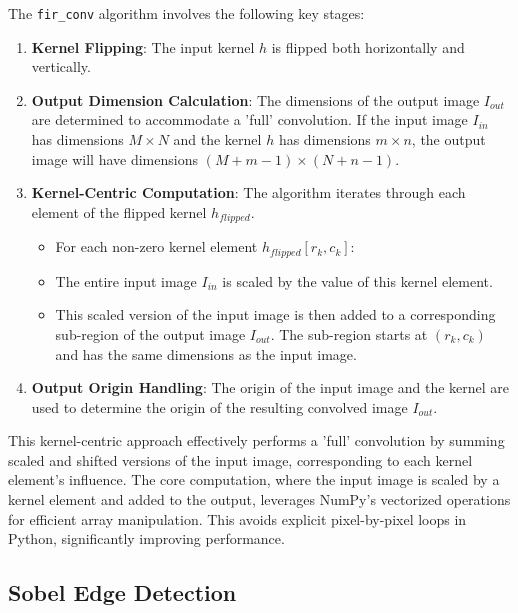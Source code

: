 \documentclass[12pt,a4paper]{article}
\begin{document}
The \texttt{fir\_conv} algorithm involves the following key stages:

\begin{enumerate}
    \item \textbf{Kernel Flipping}: The input kernel $h$ is flipped both horizontally and vertically.
    \item \textbf{Output Dimension Calculation}: The dimensions of the output image $I_{out}$ are determined to accommodate a 'full' convolution. If the input image $I_{in}$ has dimensions $M \times N$ and the kernel $h$ has dimensions $m \times n$, the output image will have dimensions $(M+m-1) \times (N+n-1)$.
    \item \textbf{Kernel-Centric Computation}: The algorithm iterates through each element of the flipped kernel $h_{flipped}$.
        \begin{itemize}
            \item For each non-zero kernel element $h_{flipped}[r_k, c_k]$:
                \item The entire input image $I_{in}$ is scaled by the value of this kernel element.
                \item This scaled version of the input image is then added to a corresponding sub-region of the output image $I_{out}$. The sub-region starts at $(r_k, c_k)$ and has the same dimensions as the input image.
        \end{itemize}
    \item \textbf{Output Origin Handling}: The origin of the input image and the kernel are used to determine the origin of the resulting convolved image $I_{out}$.
\end{enumerate}

This kernel-centric approach effectively performs a 'full' convolution by summing scaled and shifted versions of the input image, corresponding to each kernel element's influence. The core computation, where the input image is scaled by a kernel element and added to the output, leverages NumPy's vectorized operations for efficient array manipulation. This avoids explicit pixel-by-pixel loops in Python, significantly improving performance.



\newpage

\subsection{Sobel Edge Detection} \label{subsec:sobel_impl}
\end{document}
